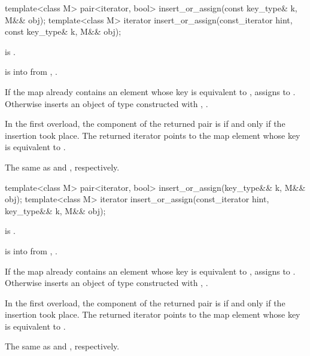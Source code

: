 %
\begin{itemdecl}
template<class M>
  pair<iterator, bool> insert_or_assign(const key_type& k, M&& obj);
template<class M>
  iterator insert_or_assign(const_iterator hint, const key_type& k, M&& obj);
\end{itemdecl}

\begin{itemdescr}
\pnum
\mandates
{} is .

\pnum
\expects
{} is  into 
from , .

\pnum
\effects
If the map already contains an element 
whose key is equivalent to ,
assigns  to .
Otherwise inserts an object of type 
constructed with , .

\pnum
\returns
In the first overload,
the  component of the returned pair is 
if and only if the insertion took place.
The returned iterator points to the map element
whose key is equivalent to .

\pnum
\complexity
The same as  and ,
respectively.
\end{itemdescr}

%
\begin{itemdecl}
template<class M>
  pair<iterator, bool> insert_or_assign(key_type&& k, M&& obj);
template<class M>
  iterator insert_or_assign(const_iterator hint, key_type&& k, M&& obj);
\end{itemdecl}

\begin{itemdescr}
\pnum
\mandates
{} is .

\pnum
\expects
{} is  into 
from , .

\pnum
\effects
If the map already contains an element 
whose key is equivalent to ,
assigns  to .
Otherwise inserts an object of type 
constructed with , .

\pnum
\returns
In the first overload,
the  component of the returned pair is 
if and only if the insertion took place.
The returned iterator points to the map element
whose key is equivalent to .

\pnum
\complexity
The same as  and ,
respectively.
\end{itemdescr}

